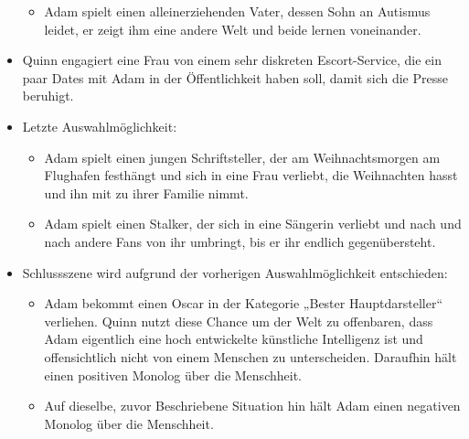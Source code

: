 \begin{itemize}
\begin{itemize}
\item Adam spielt einen alleinerziehenden Vater, dessen Sohn an Autismus leidet, er zeigt ihm eine andere Welt und beide lernen voneinander.
\end{itemize}
\item Quinn engagiert eine Frau von einem sehr diskreten Escort-Service, die ein paar Dates mit Adam in der Öffentlichkeit haben soll, damit sich die Presse beruhigt.
\item Letzte Auswahlmöglichkeit:
\begin{itemize}
\item Adam spielt einen jungen Schriftsteller, der am Weihnachtsmorgen am Flughafen festhängt und sich in eine Frau verliebt, die Weihnachten hasst und ihn mit zu ihrer Familie nimmt.
\item Adam spielt einen Stalker, der sich in eine Sängerin verliebt und nach und nach andere Fans von ihr umbringt, bis er ihr endlich gegenübersteht.
\end{itemize}
\item Schlussszene wird aufgrund der vorherigen Auswahlmöglichkeit entschieden:
\begin{itemize}
\item Adam bekommt einen Oscar in der Kategorie „Bester Hauptdarsteller“ verliehen. Quinn nutzt diese Chance um der Welt zu offenbaren, dass Adam eigentlich eine hoch entwickelte künstliche Intelligenz ist und offensichtlich nicht von einem Menschen zu unterscheiden. Daraufhin hält einen positiven Monolog über die Menschheit.
\item Auf dieselbe, zuvor Beschriebene Situation hin hält Adam einen negativen Monolog über die Menschheit.
\end{itemize}
\end{itemize}
